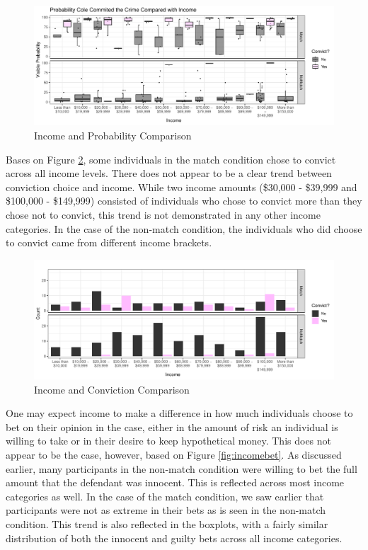\documentclass[print]{nuthesis}
\begin{document}
\begin{figure}

{\centering \includegraphics[width=\linewidth]{thesis_files/figure-latex/probincome-1} 

}

\caption{Income and Probability Comparison}\label{fig:probincome}
\end{figure}

Bases on Figure \ref{fig:convictsincome}, some individuals in the match condition chose to convict across all income levels.
There does not appear to be a clear trend between conviction choice and income.
While two income amounts (\$30,000 - \$39,999 and \$100,000 - \$149,999) consisted of individuals who chose to convict more than they chose not to convict, this trend is not demonstrated in any other income categories.
In the case of the non-match condition, the individuals who did choose to convict came from different income brackets.

\begin{figure}

{\centering \includegraphics[width=\linewidth]{thesis_files/figure-latex/convictsincome-1} 

}

\caption{Income and Conviction Comparison}\label{fig:convictsincome}
\end{figure}

One may expect income to make a difference in how much individuals choose to bet on their opinion in the case, either in the amount of risk an individual is willing to take or in their desire to keep hypothetical money.
This does not appear to be the case, however, based on Figure \ref{fig:incomebet}.
As discussed earlier, many participants in the non-match condition were willing to bet the full amount that the defendant was innocent.
This is reflected across most income categories as well.
In the case of the match condition, we saw earlier that participants were not as extreme in their bets as is seen in the non-match condition.
This trend is also reflected in the boxplots, with a fairly similar distribution of both the innocent and guilty bets across all income categories.
\end{document}
